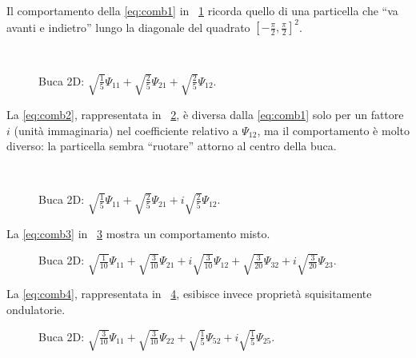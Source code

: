 Il comportamento della \eqref{eq:comb1} in \figurename~\ref{fig:comb1} 
ricorda quello di una particella
che ``va avanti e indietro'' lungo la diagonale del quadrato
$[-\frac{\pi}{2}, \frac{\pi}{2}]^{2}$.
\begin{figure}\begin{center}
   \\ 
  \caption{Buca 2D: $                 %
      \sqrt{\tfrac{1}{ 5}}\Psi_{11}  + %
      \sqrt{\tfrac{2}{ 5}}\Psi_{21}  + %
      \sqrt{\tfrac{2}{ 5}}\Psi_{12}    %
  $.}
  \label{fig:comb1}
\end{center}\end{figure}

La \eqref{eq:comb2}, rappresentata in \figurename~\ref{fig:comb2},
è diversa dalla \eqref{eq:comb1} solo per
un fattore $i$ (unità immaginaria) nel coefficiente relativo
a $\Psi_{12}$, ma il comportamento è molto diverso: la particella
sembra ``ruotare'' attorno al centro della buca.
\begin{figure}\begin{center}
   \\
  \caption{Buca 2D: $                 %
      \sqrt{\tfrac{1}{ 5}}\Psi_{11}  + %
      \sqrt{\tfrac{2}{ 5}}\Psi_{21}  + %
    i \sqrt{\tfrac{2}{ 5}}\Psi_{12}    %
  $.}
  \label{fig:comb2}
\end{center}\end{figure}

La \eqref{eq:comb3} in \figurename~\ref{fig:comb3} 
mostra un comportamento misto.
\begin{figure}[p]\begin{center}
  \caption{Buca 2D: $                 %
      \sqrt{\tfrac{1}{10}}\Psi_{11}  + %
      \sqrt{\tfrac{3}{10}}\Psi_{21}  + %
    i \sqrt{\tfrac{3}{10}}\Psi_{12}  + %
      \sqrt{\tfrac{3}{20}}\Psi_{32}  + %
    i \sqrt{\tfrac{3}{20}}\Psi_{23}    %
  $.}
  \label{fig:comb3}
\end{center}\end{figure}

La \eqref{eq:comb4}, rappresentata in \figurename~\ref{fig:comb4},
esibisce invece proprietà squisitamente ondulatorie.
\begin{figure}[p]\begin{center}
  \caption{Buca 2D: $                 %
      \sqrt{\tfrac{3}{10}}\Psi_{11}  + %
      \sqrt{\tfrac{3}{10}}\Psi_{22}  + %
      \sqrt{\tfrac{1}{ 5}}\Psi_{52}  + %
    i \sqrt{\tfrac{1}{ 5}}\Psi_{25}    %
  $.}
  \label{fig:comb4}
\end{center}\end{figure}

